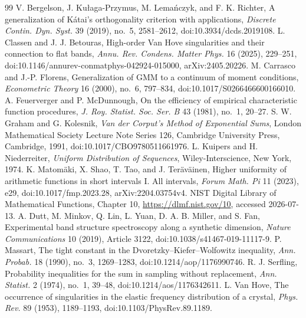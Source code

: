 \documentclass[11pt]{amsart}
\numberwithin{equation}{section}\setcounter{tocdepth}{3}\setcounter{secnumdepth}{3}
\begin{document}
\begin{thebibliography}{99}
V. Bergelson, J. Kułaga-Przymus, M. Lemańczyk, and F. K. Richter,
A generalization of Kátai's orthogonality criterion with applications,
\emph{Discrete Contin. Dyn. Syst.} 39 (2019), no.~5, 2581--2612,
doi:10.3934/dcds.2019108.
 L. Classen and J. J. Betouras, High-order Van Hove singularities and their connection to flat bands, \emph{Annu. Rev. Condens. Matter Phys.} 16 (2025), 229--251, doi:10.1146/annurev-conmatphys-042924-015000, arXiv:2405.20226.
M. Carrasco and J.-P. Florens,
Generalization of GMM to a continuum of moment conditions,
\emph{Econometric Theory} 16 (2000), no.~6, 797--834,
doi:10.1017/S0266466600166010.
A. Feuerverger and P. McDunnough,
On the efficiency of empirical characteristic function procedures,
\emph{J. Roy. Statist. Soc. Ser. B} 43 (1981), no.~1, 20--27.
S. W. Graham and G. Kolesnik,
\emph{Van der Corput's Method of Exponential Sums},
London Mathematical Society Lecture Note Series 126,
Cambridge University Press, Cambridge, 1991,
doi:10.1017/CBO9780511661976.
L. Kuipers and H. Niederreiter,
\emph{Uniform Distribution of Sequences},
Wiley-Interscience, New York, 1974.
K. Matom\"aki, X. Shao, T. Tao, and J. Ter\"av\"ainen,
Higher uniformity of arithmetic functions in short intervals I. All intervals,
\emph{Forum Math. Pi} 11 (2023), e29,
doi:10.1017/fmp.2023.28, arXiv:2204.03754v4.
 NIST Digital Library of Mathematical Functions, Chapter 10, \url{https://dlmf.nist.gov/10}, accessed 2026-07-13.
 A. Dutt, M. Minkov, Q. Lin, L. Yuan, D. A. B. Miller, and S. Fan,
Experimental band structure spectroscopy along a synthetic dimension,
\emph{Nature Communications} 10 (2019), Article 3122,
doi:10.1038/s41467-019-11117-9.
P. Massart,
The tight constant in the Dvoretzky--Kiefer--Wolfowitz inequality,
\emph{Ann. Probab.} 18 (1990), no.~3, 1269--1283,
doi:10.1214/aop/1176990746.
R. J. Serfling,
Probability inequalities for the sum in sampling without replacement,
\emph{Ann. Statist.} 2 (1974), no.~1, 39--48,
doi:10.1214/aos/1176342611.
 L. Van Hove, The occurrence of singularities in the elastic frequency distribution of a crystal, \emph{Phys. Rev.} 89 (1953), 1189--1193, doi:10.1103/PhysRev.89.1189.
\end{thebibliography}
\end{document}
